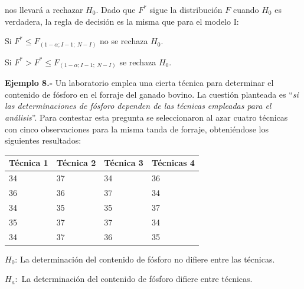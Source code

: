 \documentclass[]{book}
\theoremstyle{definition}
\theoremstyle{definition}
\theoremstyle{definition}
\theoremstyle{remark}
\begin{document}
nos llevará a rechazar \(H_{0}\). Dado que \(F^{*}\) sigue la
distribución \(F\) cuando \(H_{0}\) es verdadera, la regla de decisión
es la misma que para el modelo I:

Si \(F^{*} \leq F_{(1 - \alpha;I - 1;\ N - I)}\) no se rechaza
\(H_{0}\).

Si \(F^{*} > F^{*} \leq F_{(1 - \alpha;I - 1;\ N - I)}\) se rechaza
\(H_{0}\).

\textbf{Ejemplo 8.-} Un laboratorio emplea una cierta técnica para
determinar el contenido de fósforo en el forraje del ganado bovino. La
cuestión planteada es ``\emph{si las determinaciones de fósforo dependen
de las técnicas empleadas para el análisis}''. Para contestar esta
pregunta se seleccionaron al azar cuatro técnicas con cinco
observaciones para la misma tanda de forraje, obteniéndose los
siguientes resultados:

\begin{longtable}[]{@{}llll@{}}
\toprule
Técnica 1 & Técnica 2 & Técnica 3 & Técnicas 4\tabularnewline
\midrule
\endhead
34 & 37 & 34 & 36\tabularnewline
36 & 36 & 37 & 34\tabularnewline
34 & 35 & 35 & 37\tabularnewline
35 & 37 & 37 & 34\tabularnewline
34 & 37 & 36 & 35\tabularnewline
\bottomrule
\end{longtable}

\(H_{0}\): La determinación del contenido de fósforo no difiere entre
las técnicas.

\(H_{a}:\) La determinación del contenido de fósforo difiere entre
técnicas.
\end{document}
